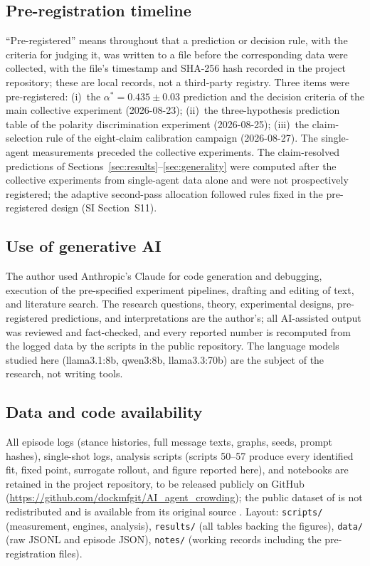 \documentclass[11pt]{article}
\newcommand{\astar}{\alpha^{*}}
\begin{document}
\subsection*{Pre-registration timeline}

``Pre-registered'' means throughout that a prediction or decision rule, with
the criteria for judging it, was written to a file before the corresponding
data were collected, with the file's timestamp and SHA-256 hash recorded in
the project repository; these are local records, not a third-party registry.
Three items were pre-registered: (i)~the $\astar = 0.435 \pm 0.03$ prediction
and the decision criteria of the main collective experiment (2026-08-23);
(ii)~the three-hypothesis prediction table of the polarity discrimination
experiment (2026-08-25); (iii)~the claim-selection rule of the eight-claim
calibration campaign (2026-08-27). The single-agent measurements preceded
the collective experiments. The claim-resolved predictions of
Sections~\ref{sec:results}--\ref{sec:generality} were computed after the
collective experiments from single-agent data alone and were not
prospectively registered; the adaptive second-pass allocation followed rules
fixed in the pre-registered design (SI Section~S11).

\subsection*{Use of generative AI}

The author used Anthropic's Claude for code generation and debugging,
execution of the pre-specified experiment pipelines, drafting and editing of
text, and literature search. The research questions, theory, experimental
designs, pre-registered predictions, and interpretations are the author's;
all AI-assisted output was reviewed and fact-checked, and every reported
number is recomputed from the logged data by the scripts in the public
repository. The language models studied here (llama3.1:8b, qwen3:8b,
llama3.3:70b) are the subject of the research, not writing tools.

\subsection*{Data and code availability}

All episode logs (stance histories, full message texts, graphs, seeds, prompt
hashes), single-shot logs, analysis scripts (scripts 50--57 produce every
identified fit, fixed point, surrogate rollout, and figure reported here), and
notebooks are retained in the project repository, to be released publicly on GitHub
(\url{https://github.com/dockmfgit/AI_agent_crowding}); the public
dataset of \citet{El2026} is not redistributed and is available from its
original source \citep{El2026data}. Layout: \texttt{scripts/} (measurement, engines, analysis),
\texttt{results/} (all tables backing the figures), \texttt{data/}
(raw JSONL and episode JSON), \texttt{notes/} (working records including the
pre-registration files).
\end{document}
